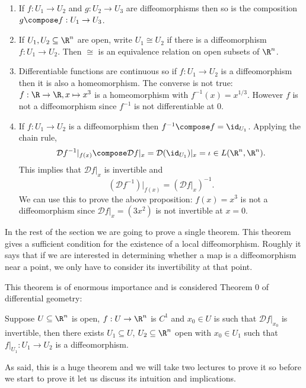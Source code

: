 \documentclass[a4paper]{article}
\newcommand*{\D}{\mathcal{D}}
\theoremstyle{definition}
\begin{document}
\begin{remark}\leavevmode
  \begin{enumerate}
  \item If \(f: U_1 \to U_2\) and \(g: U_2 \to U_3\) are diffeomorphisms then so is the composition \(g \compose f: U_1 \to U_3\).
  \item If \(U_1, U_2 \subseteq \R^n\) are open, write \(U_1 \cong U_2\) if there is a diffeomorphism \(f: U_1 \to U_2\). Then \(\cong\) is an equivalence relation on open subsets of \(\R^n\).
  \item Differentiable functions are continuous so if \(f: U_1 \to U_2\) is a diffeomorphism then it is also a homeomorphism. The converse is not true: \(f: \R \to \R, x \mapsto x^3\) is a homeomorphism with \(f^{-1}(x) = x^{1/3}\). However \(f\) is not a diffeomorphism since \(f^{-1}\) is not differentiable at \(0\).
  \item If \(f: U_1 \to U_2\) is a diffeomorphism then \(f^{-1} \compose f = \id_{U_1}\). Applying the chain rule,
    \[
      \D f^{-1}|_{f(x)} \compose \D f|_x = \D (\id_{U_1})|_x = \iota \in L(\R^n, \R^n).
    \]
    This implies that \(\D f|_x\) is invertible and
    \[
      (\D f^{-1})|_{f(x)} = (\D f|_x)^{-1}.
    \]
    We can use this to prove the above proposition: \(f(x) = x^3\) is not a diffeomorphism since \(\D f|_x = (3x^2)\) is not invertible at \(x = 0\).
  \end{enumerate}
\end{remark}

In the rest of the section we are going to prove a single theorem. This theorem gives a sufficient condition for the existence of a local diffeomorphism. Roughly it says that if we are interested in determining whether a map is a diffeomorphism near a point, we only have to consider its invertibility at that point.

This theorem is of enormous importance and is considered Theorem \(0\) of differential geometry:

\begin{theorem}
  \label{thm:inverse function}
  Suppose \(U \subseteq \R^n\) is open, \(f: U \to \R^n\) is \(C^1\) and \(x_0 \in U\) is such that \(\D f|_{x_0}\) is invertible, then there exists \(U_1 \subseteq U\), \(U_2 \subseteq \R^n\) open with \(x_0 \in U_1\) such that \(f|_{U_1}: U_1 \to U_2\) is a diffeomorphism.
\end{theorem}

As said, this is a huge theorem and we will take two lectures to prove it so before we start to prove it let us discuss its intuition and implications.
\end{document}
